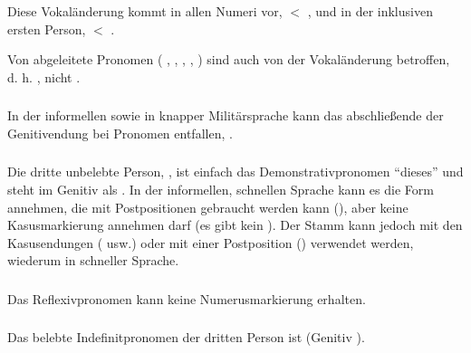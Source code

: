 \noindent Diese Vokaländerung kommt in allen Numeri vor,  $<$ , und in der inklusiven ersten Person,  $<$ .

Von  abgeleitete Pronomen ( ,  ,  ,  ,  ) sind auch von der Vokaländerung betroffen, d. h. , nicht .

\subsubsection{} In der informellen sowie in knapper Militärsprache kann das abschließende  der Genitivendung bei Pronomen entfallen, .\label{morph:pron:gen-clipped} 

\subsubsection{} Die dritte unbelebte Person, , ist einfach das Demonstrativpronomen ``dieses'' und steht im Genitiv als . In der informellen, schnellen Sprache kann es die Form  annehmen, die mit Postpositionen gebraucht werden kann (), aber keine Kasusmarkierung annehmen darf (es gibt kein ). Der Stamm  kann jedoch mit den Kasusendungen ( usw.) oder mit einer Postposition () verwendet werden, wiederum in schneller Sprache.
\label{morph:pron:tsa}

\subsubsection{} Das Reflexivpronomen  kann keine Numerusmarkierung erhalten. 

\subsubsection{} Das belebte Indefinitpronomen der dritten Person ist  (Genitiv ).

